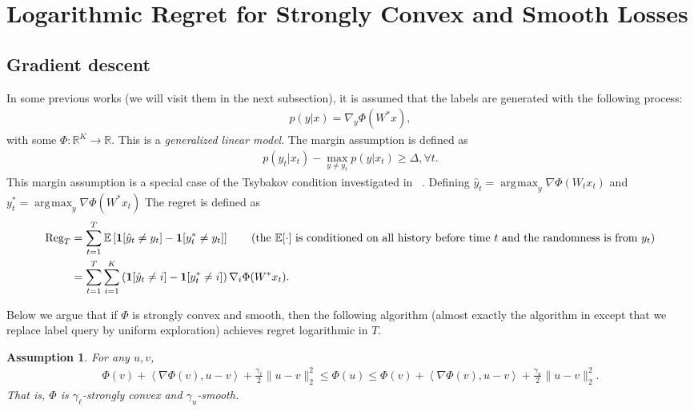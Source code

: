 \documentclass{article}
\newcommand{\Reg}{\text{\rm Reg}}
\newcommand{\one}{\boldsymbol{1}}
\newcommand{\nb}{\nabla}
\newcommand{\field}[1]{\mathbb{#1}}
\newcommand{\E}{\field{E}}
\newcommand{\inner}[1]{ \left\langle {#1} \right\rangle }
\newtheorem{assumption}{Assumption}
\DeclareMathOperator*{\argmax}{\arg\!\max}
\begin{document}
\section{Logarithmic Regret for Strongly Convex and Smooth Losses}
\subsection{Gradient descent}
In some previous works (we will visit them in the next subsection), it is assumed that the labels are generated with the following process: 
\begin{align}
    p(y|x) = \nabla_y\Phi(W^*x), 
\end{align}
with some $\Phi: \mathbb{R}^K \rightarrow \mathbb{R}$. This is a \textit{generalized linear model}.  
The margin assumption is defined as 
\begin{align}
    p(y_t|x_t) - \max_{y\neq y_t}p(y|x_t) \geq \Delta, \forall t.  \label{eqn:new margin}
\end{align}
This margin assumption is a special case of the Tsybakov condition investigated in ~\cite{agarwal2013selective}. 
Defining $\hat{y}_t = \argmax_y \nabla\Phi(W_tx_t)$ and $y^*_t = \argmax_y \nabla\Phi(W^*x_t) $ The regret is defined as
\begin{align}
    \Reg_T &= \sum_{t=1}^T \E\left[ \one[\hat{y}_t\neq y_t] - \one[y_t^*\neq y_t]\right] \tag{the $\E[\cdot]$ is conditioned on all history before time $t$ and the randomness is from $y_t$} \\
    &= \sum_{t=1}^T \sum_{i=1}^K \left(\one[\hat{y}_t\neq i] - \one[y^*_t\neq i]\right)\nabla_i\Phi(W^*x_t). \label{eqn:new regret}
\end{align}

Below we argue that if $\Phi$ is strongly convex and smooth, then the following algorithm (almost exactly the algorithm in \cite{agarwal2013selective} except that we replace label query by uniform exploration) achieves regret logarithmic in $T$. 

\begin{assumption}
For any $u,v$, 
\begin{align*}
     \Phi(v) + \inner{\nb\Phi(v),u-v} + \frac{\gamma_\ell}{2}\|u-v\|_2^2 \leq \Phi(u)\leq \Phi(v) + \inner{\nb\Phi(v),u-v} + \frac{\gamma_u}{2}\|u-v\|_2^2. 
\end{align*}
That is, $\Phi$ is $\gamma_\ell$-strongly convex and $\gamma_u$-smooth. 
\end{assumption}
\end{document}
